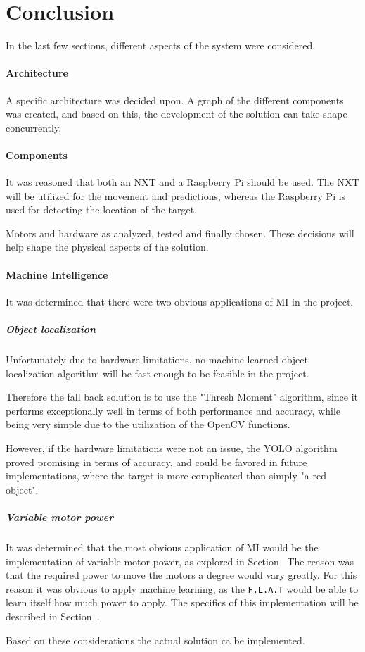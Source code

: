 \section{Conclusion}
In the last few sections, different aspects of the system were considered.

\paragraph{Architecture}
A specific architecture was decided upon.
A graph of the different components was created, and based on this, the development of the solution can take shape concurrently.


\paragraph{Components}
It was reasoned that both an NXT and a Raspberry Pi should be used.
The NXT will be utilized for the movement and predictions, whereas the Raspberry Pi is used for detecting the location of the target.


Motors and hardware as analyzed, tested and finally chosen.
These decisions will help shape the physical aspects of the solution.


\paragraph{Machine Intelligence}
It was determined that there were two obvious applications of MI in the project.

\subparagraph{Object localization}
Unfortunately due to hardware limitations, no machine learned object localization algorithm will be fast enough to be feasible in the project.

Therefore the fall back solution is to use the "Thresh Moment" algorithm, since it performs exceptionally well in terms of both performance and accuracy, while being very simple due to the utilization of the OpenCV functions.

However, if the hardware limitations were not an issue, the YOLO algorithm proved promising in terms of accuracy, and could be favored in future implementations, where the target is more complicated than simply "a red object".

\subparagraph{Variable motor power}
It was determined that the most obvious application of MI would be the implementation of variable motor power, as explored in Section~
The reason was that the required power to move the motors a degree would vary greatly.
For this reason it was obvious to apply machine learning, as the \texttt{F.L.A.T} would be able to learn itself how much power to apply.
The specifics of this implementation will be described in Section~.


Based on these considerations the actual solution ca be implemented.